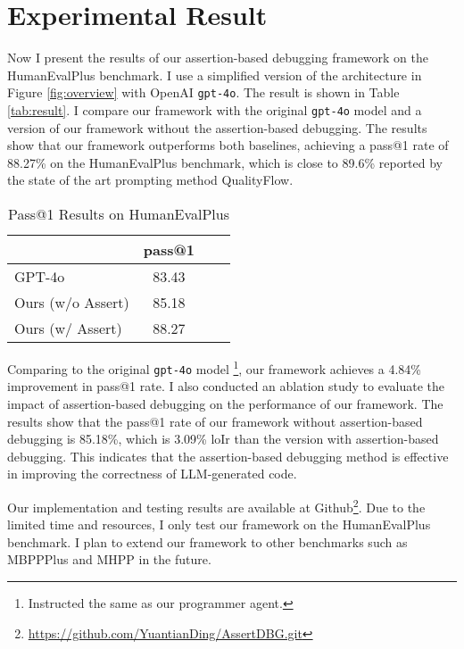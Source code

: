 \section{Experimental Result}

Now I present the results of our assertion-based debugging framework on the HumanEvalPlus benchmark. I use a simplified version of the architecture in Figure \ref{fig:overview} with OpenAI \texttt{gpt-4o}. The result is shown in Table \ref{tab:result}. I compare our framework with the original \texttt{gpt-4o} model and a version of our framework without the assertion-based debugging. The results show that our framework outperforms both baselines, achieving a pass@1 rate of 88.27\% on the HumanEvalPlus benchmark, which is close to 89.6\% reported by the state of the art prompting method QualityFlow\cite{QualityFlow}.

\begin{table}[ht]
    \centering
    \caption{Pass@1 Results on HumanEvalPlus}
    \begin{tabular}{l c c c}
        & pass@1 \\
        \hline
        GPT-4o & 83.43 \\
        Ours (w/o Assert) & 85.18 \\
        Ours (w/ Assert) & 88.27 \\
    \end{tabular}
\end{table}

Comparing to the original \texttt{gpt-4o} model \footnote{Instructed the same as our programmer agent. }, our framework achieves a 4.84\% improvement in pass@1 rate. I also conducted an ablation study to evaluate the impact of assertion-based debugging on the performance of our framework. The results show that the pass@1 rate of our framework without assertion-based debugging is 85.18\%, which is 3.09\% loIr than the version with assertion-based debugging. This indicates that the assertion-based debugging method is effective in improving the correctness of LLM-generated code.

Our implementation and testing results are available at Github\footnote{\href{https://github.com/YuantianDing/AssertDBG.git}{https://github.com/YuantianDing/AssertDBG.git}}. Due to the limited time and resources, I only test our framework on the HumanEvalPlus benchmark. I plan to extend our framework to other benchmarks such as MBPPPlus\cite{evalplus} and MHPP\cite{MHPP} in the future. 
